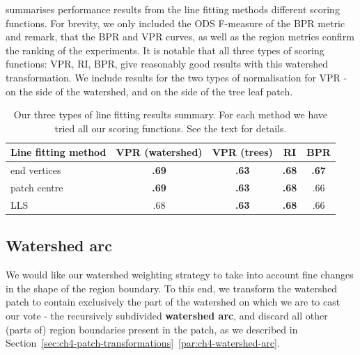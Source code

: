  summarises performance results from the line fitting methods \wrt different scoring functions. For brevity, we only included %
the ODS F-measure of the BPR metric and remark, that the BPR and VPR curves, as well as the region metrics confirm the ranking of the experiments. 
It is notable that all three types of scoring functions: VPR, RI, BPR, give reasonably good results %
with this watershed transformation. We include results for the two types of normalisation for VPR - on the side of the watershed, and on the side of the tree leaf patch.

\begin{table}[htbp]
\renewcommand{\arraystretch}{1.3}
\centering
\scriptsize
\begin{tabular}{|l|c|c|c|c|}
\hline 
Line fitting method & VPR (watershed) & VPR (trees) & RI & BPR \\
\hline 
end vertices & {\bf .69} & {\bf .63} & {\bf .68} & {\bf .67} \\
patch centre & {\bf .69} & {\bf .63} & {\bf .68} & .66 \\
LLS & .68 & {\bf .63} & {\bf .68} & .66 \\
\hline
\end{tabular}
\caption[Our three types of line fitting results summary]{Our three types of line fitting results summary. For each method we have tried all our scoring functions. See the text for details.}
\label{tab:line-fitting-experiments}
\end{table}


\subsection{Watershed arc}
We would like our watershed weighting strategy to take into account fine changes in the shape of the region boundary. To this end, we transform the watershed patch to contain exclusively the part of the watershed on which we are to cast our vote - the recursively subdivided {\bf watershed arc}, and discard all other (parts of) region boundaries present in the patch, as we described in Section~\ref*{sec:ch4-patch-transformations}~\ref{par:ch4-watershed-arc}.

